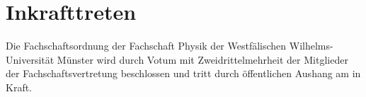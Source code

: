 \section{Inkrafttreten}
Die Fachschaftsordnung der Fachschaft Physik der Westfälischen Wilhelms-Universität Münster wird durch Votum mit Zweidrittelmehrheit der Mitglieder der Fachschaftsvertretung beschlossen und tritt durch öffentlichen Aushang am  in Kraft.





